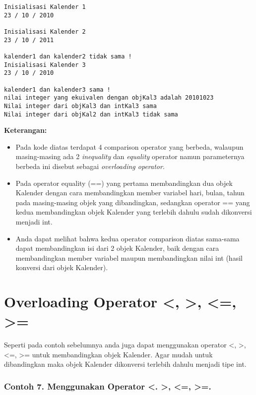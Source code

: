 \begin{verbatim}
Inisialisasi Kalender 1
23 / 10 / 2010

Inisialisasi Kalender 2
23 / 10 / 2011

kalender1 dan kalender2 tidak sama !
Inisialisasi Kalender 3
23 / 10 / 2010

kalender1 dan kalender3 sama !
nilai integer yang ekuivalen dengan objKal3 adalah 20101023
Nilai integer dari objKal3 dan intKal3 sama
Nilai integer dari objKal2 dan intKal3 tidak sama
\end{verbatim}

\textbf{Keterangan:}

\begin{itemize}
\tightlist
\item
  Pada kode diatas terdapat 4 comparison operator yang berbeda, walaupun
  masing-masing ada 2 \emph{inequality} dan \emph{equality} operator
  namun parameternya berbeda ini disebut sebagai \emph{overloading
  operator}.
\item
  Pada operator equality (==) yang pertama membandingkan dua objek
  Kalender dengan cara membandingkan member variabel hari, bulan, tahun
  pada masing-masing objek yang dibandingkan, sedangkan operator == yang
  kedua membandingkan objek Kalender yang terlebih dahulu sudah
  dikonversi menjadi int.
\item
  Anda dapat melihat bahwa kedua operator comparison diatas sama-sama
  dapat membandingkan isi dari 2 objek Kalender, baik dengan cara
  membandingkan member variabel maupun membandingkan nilai int (hasil
  konversi dari objek Kalender).
\end{itemize}

\section{Overloading Operator \textless{}, \textgreater{},
\textless{}=, \textgreater{}=}\label{overloading-operator}

Seperti pada contoh sebelumnya anda juga dapat menggunakan operator
\textless{}, \textgreater{}, \textless{}=, \textgreater{}= untuk
membandingkan objek Kalender. Agar mudah untuk dibandingkan maka objek
Kalender dikonversi terlebih dahulu menjadi tipe int.

\subsubsection*{Contoh 7. Menggunakan Operator \textless{}. \textgreater{},
\textless{}=, \textgreater{}=.}

